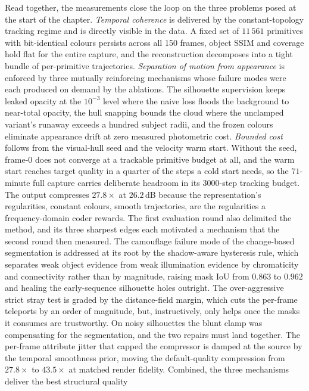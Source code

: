 Read together, the measurements close the loop on the three problems posed at the
start of the chapter. \emph{Temporal coherence} is delivered by the constant-topology
tracking regime and is directly visible in the data. A fixed set of $11\,561$
primitives with bit-identical colours persists across all 150 frames, object SSIM and
coverage hold flat for the entire capture, and the reconstruction decomposes into a
tight bundle of per-primitive trajectories. \emph{Separation of motion from
appearance} is enforced by three mutually reinforcing mechanisms whose failure modes
were each produced on demand by the ablations. The silhouette supervision keeps
leaked opacity at the $10^{-3}$ level where the naive loss floods the background to
near-total opacity, the hull snapping bounds the cloud where the unclamped variant's
runaway exceeds a hundred subject radii, and the frozen colours eliminate appearance
drift at zero measured photometric cost. \emph{Bounded cost} follows from the
visual-hull seed and the velocity warm start. Without the seed, frame-0 does not
converge at a trackable primitive budget at all, and the warm start reaches target
quality in a quarter of the steps a cold start needs, so the $71$-minute full capture
carries deliberate headroom in its $3000$-step tracking budget. The output compresses
$27.8\times$ at $26.2$\,dB because the representation's regularities, constant
colours, smooth trajectories, are the regularities a frequency-domain coder rewards. The first evaluation round also delimited the method, and its three sharpest
edges each motivated a mechanism that the second round then measured.
The camouflage failure mode of the change-based segmentation is addressed at its
root by the shadow-aware hysteresis rule, which separates weak object evidence from
weak illumination evidence by chromaticity and connectivity rather than by magnitude,
raising mask IoU from $0.863$ to $0.962$ and healing the early-sequence silhouette
holes outright. The over-aggressive strict stray test is graded by the
distance-field margin, which cuts the per-frame teleports by an order of magnitude,
but, instructively, only helps once the masks it consumes are trustworthy. On noisy
silhouettes the blunt clamp was compensating for the segmentation, and the two
repairs must land together. The per-frame attribute jitter that capped the
compressor is damped at the source by the temporal smoothness prior, moving the
default-quality compression from $27.8\times$ to $43.5\times$ at matched render
fidelity. Combined, the three mechanisms deliver the best structural quality
